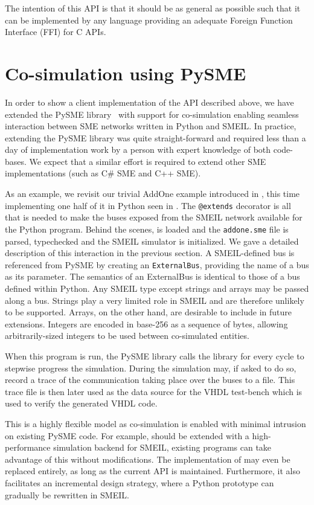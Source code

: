 The intention of this API is that it should be as general as possible such that
it can be implemented by any language providing an adequate Foreign Function
Interface (FFI) for C APIs.

\section{Co-simulation using PySME}
In order to show a client implementation of the API described above, we have
extended the PySME library~\cite{pysme} with support for co-simulation enabling
seamless interaction between SME networks written in Python and SMEIL. In
practice, extending the PySME library was quite straight-forward and required
less than a day of implementation work by a person with expert knowledge of both
code-bases. We expect that a similar effort is required to extend other SME
implementations (such as C\# SME and C++ SME).

As an example, we revisit our trivial AddOne example introduced in
, this time implementing one half of it in Python seen in
. The \texttt{@extends} decorator is all that is needed to
make the buses exposed from the SMEIL network available for the Python
program. Behind the scenes, \libsme{} is loaded and the \texttt{addone.sme} file
is parsed, typechecked and the \libsme{} SMEIL simulator is initialized. We gave
a detailed description of this interaction in the previous section. A
SMEIL-defined bus is referenced from PySME by creating an \texttt{ExternalBus},
providing the name of a bus as its parameter. The semantics of an {\ttfamily
  ExternalBus} is identical to those of a bus defined within Python. Any SMEIL
type except strings and arrays may be passed along a bus. Strings play a very
limited role in SMEIL and are therefore unlikely to be supported. Arrays, on the
other hand, are desirable to include in future extensions. Integers are encoded
in base-256 as a sequence of bytes, allowing arbitrarily-sized integers to be
used between co-simulated entities.

When this program is run, the PySME library calls the \libsme{} library for
every cycle to stepwise progress the simulation. During the simulation \libsme{}
may, if asked to do so, record a trace of the communication taking place over
the buses to a file. This trace file is then later used as the data source for
the VHDL test-bench which is used to verify the generated VHDL code.

This is a highly flexible model as co-simulation is enabled with minimal
intrusion on existing PySME code. For example, should \libsme{} be extended with
a high-performance simulation backend for SMEIL, existing programs can take
advantage of this without modifications. The implementation of \libsme{} may
even be replaced entirely, as long as the current API is
maintained. Furthermore, it also facilitates an incremental design strategy,
where a Python prototype can gradually be rewritten in SMEIL.

